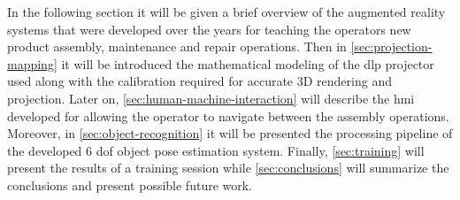In the following section it will be given a brief overview of the augmented reality systems that were developed over the years for teaching the operators new product assembly, maintenance and repair operations. Then in \cref{sec:projection-mapping} it will be introduced the mathematical modeling of the \gls{dlp} projector used along with the calibration required for accurate 3D rendering and projection. Later on, \cref{sec:human-machine-interaction} will describe the \gls{hmi} developed for allowing the operator to navigate between the assembly operations. Moreover, in \cref{sec:object-recognition} it will be presented the processing pipeline of the developed 6 \gls{dof} object pose estimation system. Finally, \cref{sec:training} will present the results of a training session while \cref{sec:conclusions} will summarize the conclusions and present possible future work.
